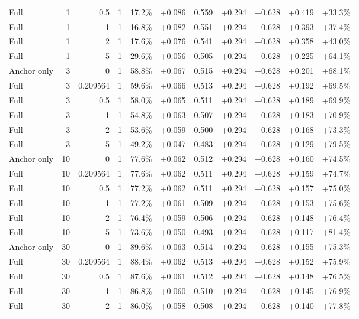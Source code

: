 \begin{table}[htbp]
\begin{tabular}{lrrrccccccc}
Full & 1 & 0.5 & 1 & 17.2\% & +0.086 & 0.559 & +0.294 & +0.628 & +0.419 & +33.3\% \\
Full & 1 & 1 & 1 & 16.8\% & +0.082 & 0.551 & +0.294 & +0.628 & +0.393 & +37.4\% \\
Full & 1 & 2 & 1 & 17.6\% & +0.076 & 0.541 & +0.294 & +0.628 & +0.358 & +43.0\% \\
Full & 1 & 5 & 1 & 29.6\% & +0.056 & 0.505 & +0.294 & +0.628 & +0.225 & +64.1\% \\
Anchor only & 3 & 0 & 1 & 58.8\% & +0.067 & 0.515 & +0.294 & +0.628 & +0.201 & +68.1\% \\
Full & 3 & 0.209564 & 1 & 59.6\% & +0.066 & 0.513 & +0.294 & +0.628 & +0.192 & +69.5\% \\
Full & 3 & 0.5 & 1 & 58.0\% & +0.065 & 0.511 & +0.294 & +0.628 & +0.189 & +69.9\% \\
Full & 3 & 1 & 1 & 54.8\% & +0.063 & 0.507 & +0.294 & +0.628 & +0.183 & +70.9\% \\
Full & 3 & 2 & 1 & 53.6\% & +0.059 & 0.500 & +0.294 & +0.628 & +0.168 & +73.3\% \\
Full & 3 & 5 & 1 & 49.2\% & +0.047 & 0.483 & +0.294 & +0.628 & +0.129 & +79.5\% \\
Anchor only & 10 & 0 & 1 & 77.6\% & +0.062 & 0.512 & +0.294 & +0.628 & +0.160 & +74.5\% \\
Full & 10 & 0.209564 & 1 & 77.6\% & +0.062 & 0.511 & +0.294 & +0.628 & +0.159 & +74.7\% \\
Full & 10 & 0.5 & 1 & 77.2\% & +0.062 & 0.511 & +0.294 & +0.628 & +0.157 & +75.0\% \\
Full & 10 & 1 & 1 & 77.2\% & +0.061 & 0.509 & +0.294 & +0.628 & +0.153 & +75.6\% \\
Full & 10 & 2 & 1 & 76.4\% & +0.059 & 0.506 & +0.294 & +0.628 & +0.148 & +76.4\% \\
Full & 10 & 5 & 1 & 73.6\% & +0.050 & 0.493 & +0.294 & +0.628 & +0.117 & +81.4\% \\
Anchor only & 30 & 0 & 1 & 89.6\% & +0.063 & 0.514 & +0.294 & +0.628 & +0.155 & +75.3\% \\
Full & 30 & 0.209564 & 1 & 88.4\% & +0.062 & 0.513 & +0.294 & +0.628 & +0.152 & +75.9\% \\
Full & 30 & 0.5 & 1 & 87.6\% & +0.061 & 0.512 & +0.294 & +0.628 & +0.148 & +76.5\% \\
Full & 30 & 1 & 1 & 86.8\% & +0.060 & 0.510 & +0.294 & +0.628 & +0.145 & +76.9\% \\
Full & 30 & 2 & 1 & 86.0\% & +0.058 & 0.508 & +0.294 & +0.628 & +0.140 & +77.8\% \\

\end{tabular}
\end{table}
